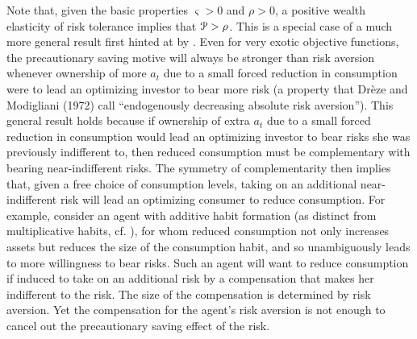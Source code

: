 Note that, given the basic properties $\varsigma>0$ and $\rho > 0$, a
positive wealth elasticity of risk tolerance implies that ${\cal P} >
\rho$.  This is a special case of a much more general result first
hinted at by \cite{DrezeModigliani}.  Even for very exotic objective
functions, the precautionary saving motive will always be stronger
than risk aversion whenever ownership of more $a_{t}$ due to a small
forced reduction in consumption were to lead an optimizing investor to
bear more risk (a property that Dr\`eze and Modigliani (1972) call
``endogenously decreasing absolute risk aversion''). This general
result holds because if ownership of extra $a_{t}$ due to a small
forced reduction in consumption would lead an optimizing investor to
bear risks she was previously indifferent to, then reduced consumption
must be complementary with bearing near-indifferent risks. The
symmetry of complementarity then implies that, given a free choice of
consumption levels, taking on an additional near-indifferent risk will
lead an optimizing consumer to reduce consumption. For example,
consider an agent with additive habit formation (as distinct from
multiplicative habits, cf. \cite{carroll:solvinghabits}), for whom
reduced consumption not only increases assets but reduces the size of
the consumption habit, and so unambiguously leads to more willingness
to bear risks.  Such an agent will want to reduce consumption if
induced to take on an additional risk by a compensation that makes her
indifferent to the risk.  The size of the compensation is determined
by risk aversion.  Yet the compensation for the agent's risk aversion
is not enough to cancel out the precautionary saving effect of the
risk.


